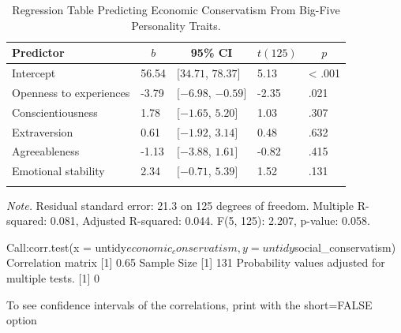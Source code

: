 \documentclass[man]{apa6}
\begin{document}
\begin{table}[tbp]
\begin{center}
\begin{threeparttable}
\caption{\label{tab:table4}Regression Table Predicting Economic Conservatism From Big-Five Personality Traits.}
\begin{tabular}{lllll}
\toprule
Predictor & \multicolumn{1}{c}{$b$} & \multicolumn{1}{c}{95\% CI} & \multicolumn{1}{c}{$t(125)$} & \multicolumn{1}{c}{$p$}\\
\midrule
Intercept & 56.54 & $[34.71$, $78.37]$ & 5.13 & < .001\\
Openness to experiences & -3.79 & $[-6.98$, $-0.59]$ & -2.35 & .021\\
Conscientiousness & 1.78 & $[-1.65$, $5.20]$ & 1.03 & .307\\
Extraversion & 0.61 & $[-1.92$, $3.14]$ & 0.48 & .632\\
Agreeableness & -1.13 & $[-3.88$, $1.61]$ & -0.82 & .415\\
Emotional stability & 2.34 & $[-0.71$, $5.39]$ & 1.52 & .131\\
\bottomrule
\addlinespace
\end{tabular}
\begin{tablenotes}[para]
\normalsize{\textit{Note.} Residual standard error: 21.3 on 125 degrees of freedom. Multiple R-squared: 0.081, Adjusted R-squared: 0.044. F(5, 125): 2.207, p-value: 0.058.}
\end{tablenotes}
\end{threeparttable}
\end{center}
\end{table}

Call:corr.test(x =
untidy\(economic_conservatism, y = untidy\)social\_conservatism)
Correlation matrix {[}1{]} 0.65 Sample Size {[}1{]} 131 Probability
values adjusted for multiple tests. {[}1{]} 0

To see confidence intervals of the correlations, print with the
short=FALSE option
\end{document}
